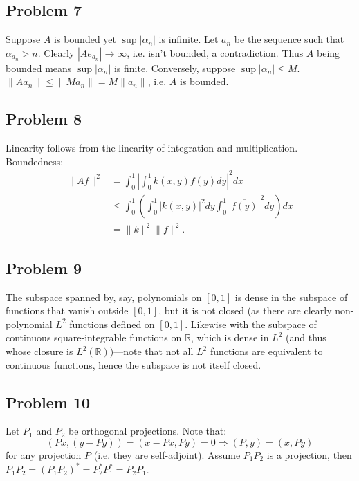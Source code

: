 \documentclass[11pt]{article}
\newcommand{\io}{\int_0^1}
\begin{document}
\subsection*{Problem 7}
Suppose $A$ is bounded yet $\sup|\alpha_n|$ is infinite. Let $a_n$ be the
sequence such that $\alpha_{a_n} > n$. Clearly $|Ae_{a_n}| \to \infty$, i.e.
isn't bounded, a contradiction. Thus $A$ being bounded means $\sup|\alpha_n|$ is
finite. Conversely, suppose $\sup|\alpha_n| \leq M$. $\|Aa_n\| \leq \|Ma_n\| =
M\|a_n\|$, i.e. $A$ is bounded.

\subsection*{Problem 8}

Linearity follows from the linearity of integration and multiplication.
Boundedness:
\begin{align*}
  \|Af\|^2 &= \io\left|\io k(x,y)f(y)dy\right|^2dx\\
           &\leq \io\left( \io|k(x,y)|^2dy \io|\overline{f(y)}|^2dy \right)dx\\
           &= \|k\|^2\|f\|^2.
\end{align*}

\subsection*{Problem 9}

The subspace spanned by, say, polynomials on $[0,1]$ is dense in the subspace
of functions that vanish outside $[0,1]$, but it is not closed (as there are
clearly non-polynomial $L^2$ functions defined on $[0,1]$. Likewise with the
subspace of continuous square-integrable functions on $\mathbb{R}$, which is
dense in $L^2$ (and thus whose closure is $L^2(\mathbb{R})$)---note that not all
$L^2$ functions are equivalent to continuous functions, hence the subspace is not
itself closed.

\subsection*{Problem 10}

Let $P_1$ and $P_2$ be orthogonal projections. Note that: 
\begin{displaymath}
  (Px,(y-Py))=(x-Px,Py)=0 \Rightarrow (P,y)=(x,Py)
\end{displaymath}
for any projection $P$ (i.e. they are self-adjoint). Assume $P_1P_2$ is a
projection, then $P_1P_2 = (P_1P_2)^* = P_2^*P_1^* = P_2P_1$.
\end{document}
